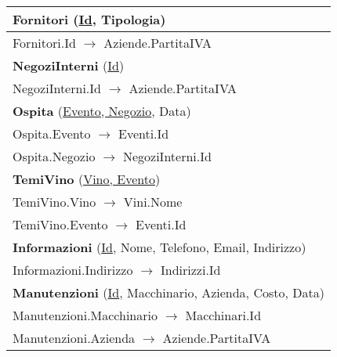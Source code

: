 \begin{center}
\begin{minipage}[t]{7.5cm}
{\begin{tabular}{P{7.5cm}}
				\midrule
				 \textbf{Fornitori} (\underline{Id}, Tipologia)                                       \\
				\midrule
				Fornitori.Id $\to$ Aziende.PartitaIVA \\                                
				\midrule
				 \textbf{NegoziInterni} (\underline{Id})                                              \\
				\midrule
				NegoziInterni.Id $\to$ Aziende.PartitaIVA \\                                
				\midrule
				 \textbf{Ospita} (\underline{Evento, Negozio}, Data)                                  \\
				\midrule
				Ospita.Evento $\to$ Eventi.Id                                                                                         \\
				\midrule
				Ospita.Negozio $\to$ NegoziInterni.Id                                                                                 \\                                
				\midrule
				 \textbf{TemiVino} (\underline{Vino, Evento})                                         \\
				\midrule
				TemiVino.Vino $\to$ Vini.Nome                                                                                         \\
				\midrule
				TemiVino.Evento $\to$ Eventi.Id                                                                                       \\                                
				\midrule
				 \textbf{Informazioni} (\underline{Id}, Nome, Telefono, Email, Indirizzo)                                              \\
				\midrule
				Informazioni.Indirizzo $\to$ Indirizzi.Id                                                                                                              \\                                
				\midrule
				 \textbf{Manutenzioni} (\underline{Id}, Macchinario, Azienda, Costo, Data)            \\
				\midrule
				Manutenzioni.Macchinario $\to$ Macchinari.Id                                                                          \\
				\midrule
				Manutenzioni.Azienda $\to$ Aziende.PartitaIVA                                                                                 \\                                

\end{tabular}}
\end{minipage}
\end{center}
